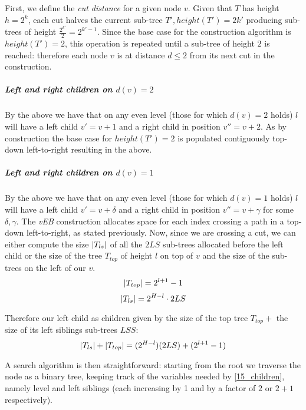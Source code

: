 First, we define the \emph{cut distance} for a given node $v$.
Given that $T$ has height $h = 2^k$, each cut halves the current sub-tree $T', height(T') = 2{k'}$ producing sub-trees of height $\frac{2^{k'}}{2} = 2^{{k'} - 1}$.
Since the base case for the construction algorithm is $height(T') = 2$, this operation is repeated until a sub-tree of height $2$ is reached: therefore each node $v$ is at distance $d \leq 2$ from its next cut in the construction.
\subparagraph{Left and right children on $d(v) = 2$} By the above we have that on any even level (those for which $d(v) = 2$ holds) $l$ will have a left child $v' = v + 1$ and a right child in position $v'' = v + 2$.
As by construction the base case for $height(T') = 2$ is populated contiguously top-down left-to-right resulting in the above.
\subparagraph{Left and right children on $d(v) = 1$} By the above we have that on any even level (those for which $d(v) = 1$ holds) $l$ will have a left child $v' = v + \delta$ and a right child in position $v'' = v + \gamma$ for some $\delta, \gamma$.
The \emph{vEB} construction allocates space for each index crossing a path in a top-down left-to-right, as stated previously.
Now, since we are crossing a cut, we can either compute the size $\lvert T_{ls}\rvert$ of all the $2LS$ sub-trees allocated before the left child or the size of the tree $T_{top}$ of height $l$ on top of $v$ and the size of the sub-trees on the left of our $v$.
\begin{equation} \label{15_top_size}
\lvert T_{top}\rvert = 2^{l+1} - 1
\end{equation}
\begin{equation} \label{15_left_sub-trees_siblings}
\lvert T_{ls}\rvert = 2^{H - l} \cdot 2LS
\end{equation}

Therefore our left child as children given by the size of the top tree $T_{top} + $ the size of its left siblings sub-trees $LSS$:
\begin{equation} \label{15_children}
\lvert T_{ls}\rvert + \lvert T_{top}\rvert = (2^{H - l})(2LS) + (2^{l+1} - 1)
\end{equation}

A search algorithm is then straightforward: starting from the root we traverse the node as a binary tree, keeping track of the variables needed by \ref{15_children}, namely level and left siblings (each increasing by 1 and by a factor of $2$ or $2 + 1$ respectively).

